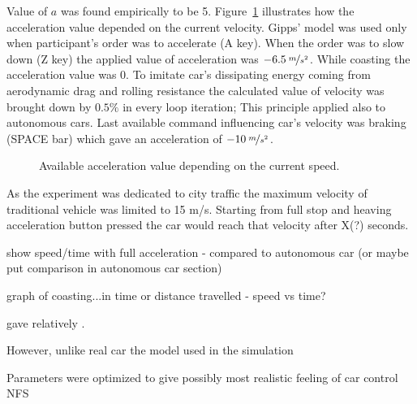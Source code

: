 \documentclass[11pt,english]{article}
\begin{document}
Value of $a$ was found empirically to be 5. Figure~\ref{fig:gipps} illustrates how the acceleration value depended on the current velocity. Gipps' model was used only when participant's order was to accelerate (A key). When the order was to slow down (Z key) the applied value of acceleration was $-6.5\:\nicefrac{m}{s^2}$. While coasting the acceleration value was $0$. To imitate car's dissipating energy coming from aerodynamic drag and rolling resistance the calculated value of velocity was brought down by $0.5\%$ in every loop iteration; This principle applied also to autonomous cars. Last available command influencing car's velocity was braking (SPACE bar) which gave an acceleration of $-10\:\nicefrac{m}{s^2}$.


\begin{figure}[!] %
\caption{Available acceleration value depending on the current speed.}
\label{fig:gipps}
\end{figure} 

As the experiment was dedicated to city traffic the maximum velocity of traditional vehicle was limited to 15 m/s. Starting from full stop and heaving acceleration button pressed the car would reach that velocity after X(?) seconds.





show speed/time with full acceleration - compared to autonomous car (or maybe put comparison in autonomous car section)

graph of coasting...in time or distance travelled - speed vs time?


gave relatively . 



However, unlike real car the model used in the simulation 


Parameters were optimized to give possibly most realistic feeling of car control NFS
\end{document}
